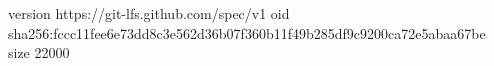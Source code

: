 version https://git-lfs.github.com/spec/v1
oid sha256:fccc11fee6e73dd8c3e562d36b07f360b11f49b285df9c9200ca72e5abaa67be
size 22000
